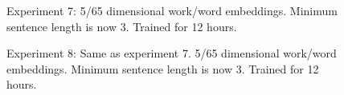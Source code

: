 \documentclass{article}%
\begin{document}
\begin{figure}
\noindent{}
\caption{Experiment 7: 5/65 dimensional work/word embeddings.  Minimum sentence length is now 3. Trained for 12 hours.}
\end{figure}


\begin{figure}
\noindent{}
\caption{Experiment 8: Same as experiment 7.  5/65 dimensional work/word embeddings.  Minimum sentence length is now 3. Trained for 12 hours.}
\end{figure}
\end{document}
